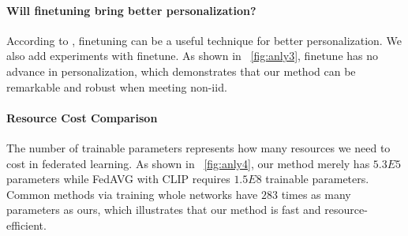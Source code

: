 \documentclass[11pt]{article}
\begin{document}
\paragraph{Will finetuning bring better personalization?}
According to \cite{yu2020salvaging}, finetuning can be a useful technique for better personalization.
We also add experiments with finetune.
As shown in \figurename~\ref{fig:anly3}, finetune has no advance in personalization, which demonstrates that our method can be remarkable and robust when meeting non-iid.

\paragraph{Resource Cost Comparison}
The number of trainable parameters represents how many resources we need to cost in federated learning.
As shown in \figurename~\ref{fig:anly4}, our method merely has $5.3E5$ parameters while FedAVG with CLIP requires $1.5E8$ trainable parameters.
Common methods via training whole networks have $283$ times as many parameters as ours, which illustrates that our method is fast and resource-efficient.
\end{document}
